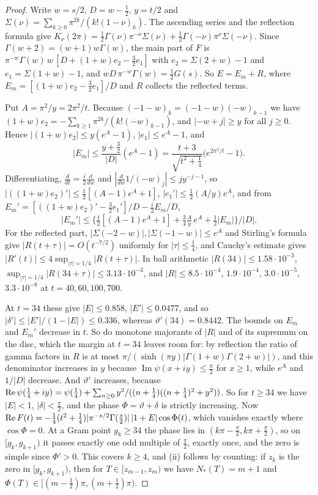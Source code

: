 \begin{proof}
Write $w=s/2$, $D=w-\frac12$, $y=t/2$ and $\Sigma(\nu)=\sum_{k\ge0}\pi^{2k}/(k!(1-\nu)_k)$. The ascending series and the reflection formula give $K_\nu(2\pi)=\frac12\Gamma(\nu)\pi^{-\nu}\Sigma(\nu)+\frac12\Gamma(-\nu)\pi^\nu\Sigma(-\nu)$. Since $\Gamma(w+2)=(w+1)w\Gamma(w)$, the main part of $F$ is $\pi^{-w}\Gamma(w)\,w\,[D+(1+w)e_2-\frac32e_1]$ with $e_2=\Sigma(2+w)-1$ and $e_1=\Sigma(1+w)-1$, and $wD\,\pi^{-w}\Gamma(w)=\frac12G(s)$. So $E=E_m+R$, where $E_m=[(1+w)e_2-\frac32e_1]/D$ and $R$ collects the reflected terms.

Put $A=\pi^2/y=2\pi^2/t$. Because $(-1-w)_k=(-1-w)(-w)_{k-1}$ we have $(1+w)e_2=-\sum_{k\ge1}\pi^{2k}/(k!(-w)_{k-1})$, and $|-w+j|\ge y$ for all $j\ge0$. Hence $|(1+w)e_2|\le y(e^A-1)$, $|e_1|\le e^A-1$, and
\[
|E_m|\le\frac{y+\frac32}{|D|}(e^A-1)=\frac{t+3}{\sqrt{t^2+\frac14}}\big(e^{2\pi^2/t}-1\big).
\]
Differentiating, $\frac d{dt}=\frac i2\frac d{dw}$ and $|\frac d{dw}1/(-w)_j|\le jy^{-j-1}$, so $|((1+w)e_2)'|\le\frac12[(A-1)e^A+1]$, $|e_1'|\le\frac12(A/y)e^A$, and from $E_m'=[((1+w)e_2)'-\frac32e_1']/D-\frac i2E_m/D$,
\[
|E_m'|\le\Big\{\tfrac12[(A-1)e^A+1]+\tfrac34\tfrac Ay\,e^A+\tfrac12|E_m|\Big\}\Big/|D|.
\]
For the reflected part, $|\Sigma(-2-w)|,|\Sigma(-1-w)|\le e^A$ and Stirling's formula give $|R(t+\tau)|=O(t^{-7/2})$ uniformly for $|\tau|\le\frac14$, and Cauchy's estimate gives $|R'(t)|\le4\sup_{|\tau|=1/4}|R(t+\tau)|$. In ball arithmetic $|R(34)|\le1.58\cdot10^{-3}$, $\sup_{|\tau|=1/4}|R(34+\tau)|\le3.13\cdot10^{-3}$, and $|R|\le8.5\cdot10^{-4}$, $1.9\cdot10^{-4}$, $3.0\cdot10^{-5}$, $3.3\cdot10^{-8}$ at $t=40,60,100,700$.

At $t=34$ these give $|E|\le0.858$, $|E'|\le0.0477$, and so $|\delta'|\le|E'|/(1-|E|)\le0.336$, whereas $\vartheta'(34)=0.8442$. The bounds on $E_m$ and $E_m'$ decrease in $t$. So do monotone majorants of $|R|$ and of its supremum on the disc, which the margin at $t=34$ leaves room for: by reflection the ratio of gamma factors in $R$ is at most $\pi/(\sinh(\pi y)|\Gamma(1+w)\Gamma(2+w)|)$, and this denominator increases in $y$ because $\operatorname{Im}\psi(x+iy)\le\frac\pi2$ for $x\ge1$, while $e^A$ and $1/|D|$ decrease. And $\vartheta'$ increases, because $\operatorname{Re}\psi(\frac14+iy)=\psi(\frac14)+\sum_{n\ge0}y^2/((n+\frac14)((n+\frac14)^2+y^2))$. So for $t\ge34$ we have $|E|<1$, $|\delta|<\frac\pi2$, and the phase $\Phi=\vartheta+\delta$ is strictly increasing. Now $\operatorname{Re} F(t)=-\frac14(t^2+\frac14)|\pi^{-s/2}\Gamma(\frac s2)|\,|1+E|\cos\Phi(t)$, which vanishes exactly where $\cos\Phi=0$. At a Gram point $g_k\ge34$ the phase lies in $(k\pi-\frac\pi2,k\pi+\frac\pi2)$, so on $[g_k,g_{k+1})$ it passes exactly one odd multiple of $\frac\pi2$, exactly once, and the zero is simple since $\Phi'>0$. This covers $k\ge4$, and (ii) follows by counting: if $z_k$ is the zero in $[g_k,g_{k+1})$, then for $T\in[z_{m-1},z_m)$ we have $N_*(T)=m+1$ and $\Phi(T)\in[(m-\frac12)\pi,(m+\frac12)\pi)$.


\end{proof}

